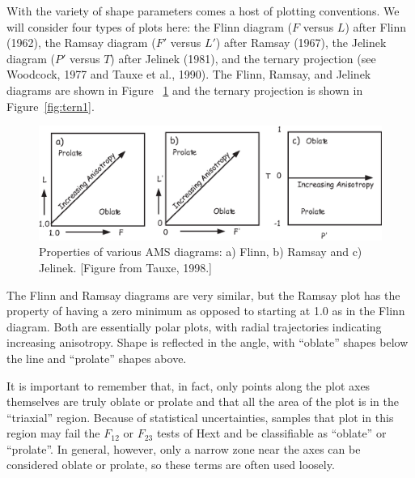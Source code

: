 With the variety of shape parameters comes a host of plotting conventions.  
We will consider four types of plots here: 
the
Flinn diagram ($F$ versus $L$) after 
Flinn (1962), \nocite{flinn62} the 
Ramsay diagram ($F'$ versus $L'$) after 
 Ramsay (1967),\nocite{ramsay67}
 the 
 Jelinek diagram ($P'$ versus $T$) after 
Jelinek 
(1981),   \nocite{jelinek81} and the
 ternary projection (see 
Woodcock, 1977 \nocite{woodcock77}  and 
 Tauxe et al., 1990).  The Flinn, Ramsay, and Jelinek diagrams are shown in Figure
~\ref{fig:diags} and the ternary projection is shown in Figure~\ref{fig:tern1}.  

\begin{figure}[htb]
\centering  \includegraphics[width=13 cm]{EPSfiles/diags.eps}
\caption{Properties of various AMS diagrams: a) Flinn,  b) Ramsay and c)
Jelinek. [Figure from Tauxe, 1998.] }
\label{fig:diags}
\end{figure}




The Flinn and Ramsay diagrams are very similar, but the Ramsay plot has the
property of having a zero minimum as opposed to starting at 1.0 as in
the Flinn diagram.  Both are essentially polar plots, with 
radial trajectories indicating increasing anisotropy.  Shape is
reflected in the angle, with ``oblate'' shapes below the line and ``prolate''
shapes above.  

It is important to remember that, in fact, only points along the
plot axes themselves are truly
oblate or prolate and that all the area of the plot is in the ``triaxial''
region.  Because of statistical uncertainties, samples that plot in this region may fail the $F_{12}$ or $F_{23}$ tests of Hext and be classifiable as
``oblate'' or ``prolate''.  In general, however, only a narrow zone near
the axes can be considered oblate or prolate, so these terms are often
used loosely. 

